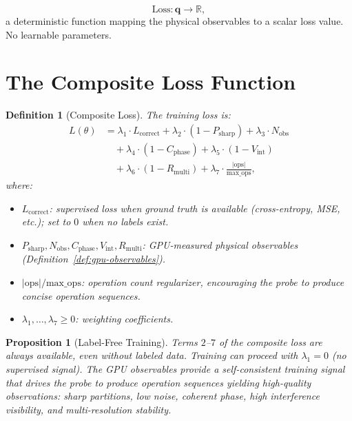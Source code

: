 \documentclass[11pt,twocolumn,a4paper]{article}
\newtheorem{proposition}[theorem]{Proposition}
\newtheorem{definition}[theorem]{Definition}
\newcommand{\R}{\mathbb{R}}
\begin{document}
\begin{equation}
\text{Loss} : \bm{q} \to \R,
\label{eq:loss-extractor}
\end{equation}
a deterministic function mapping the physical observables to a scalar
loss value. No learnable parameters.



\section{The Composite Loss Function}
\label{sec:loss}

\begin{definition}[Composite Loss]
\label{def:composite-loss}
The training loss is:
\begin{align}
L(\theta) &= \lambda_1 \cdot L_{\mathrm{correct}}
  + \lambda_2 \cdot (1 - P_{\mathrm{sharp}})
  + \lambda_3 \cdot N_{\mathrm{obs}} \nonumber\\
&\quad + \lambda_4 \cdot (1 - C_{\mathrm{phase}})
  + \lambda_5 \cdot (1 - V_{\mathrm{int}}) \nonumber\\
&\quad + \lambda_6 \cdot (1 - R_{\mathrm{multi}})
  + \lambda_7 \cdot \frac{|\text{ops}|}{\text{max\_ops}},
\label{eq:loss}
\end{align}
where:
\begin{itemize}[leftmargin=*]
\item $L_{\mathrm{correct}}$: supervised loss when ground truth is
  available (cross-entropy, MSE, etc.); set to $0$ when no labels
  exist.
\item $P_{\mathrm{sharp}}, N_{\mathrm{obs}}, C_{\mathrm{phase}},
  V_{\mathrm{int}}, R_{\mathrm{multi}}$: GPU-measured physical
  observables (Definition~\ref{def:gpu-observables}).
\item $|\text{ops}|/\text{max\_ops}$: operation count regularizer,
  encouraging the probe to produce concise operation sequences.
\item $\lambda_1, \ldots, \lambda_7 \geq 0$: weighting
  coefficients.
\end{itemize}
\end{definition}

\begin{proposition}[Label-Free Training]
\label{prop:label-free}
Terms $2$--$7$ of the composite loss are always available, even
without labeled data. Training can proceed with $\lambda_1 = 0$
(no supervised signal). The GPU observables provide a
self-consistent training signal that drives the probe to produce
operation sequences yielding high-quality observations: sharp
partitions, low noise, coherent phase, high interference
visibility, and multi-resolution stability.
\end{proposition}
\end{document}

